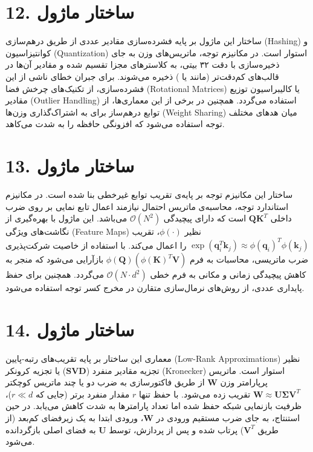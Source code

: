 \documentclass[12pt,a4paper]{report}
\begin{document}
\section*{12. ساختار ماژول }
ساختار این ماژول بر پایه فشرده‌سازی مقادیر عددی از طریق درهم‌سازی (Hashing) و کوانتیزاسیون (Quantization) استوار است. در مکانیزم توجه، ماتریس‌های وزن به جای ذخیره‌سازی با دقت ۳۲ بیتی، به کلاسترهای مجزا تقسیم شده و مقادیر آن‌ها در قالب‌های کم‌دقت‌تر (مانند  یا ) ذخیره می‌شوند. برای جبران خطای ناشی از این فشرده‌سازی، از تکنیک‌های چرخش فضا (Rotational Matrices) یا کالیبراسیون توزیع مقادیر (Outlier Handling) استفاده می‌گردد. همچنین در برخی از این معماری‌ها، از توابع درهم‌ساز برای به اشتراک‌گذاری وزن‌ها (Weight Sharing) میان هد‌های مختلف توجه استفاده می‌شود که افزونگی حافظه را به شدت می‌کاهد.

\section*{13. ساختار ماژول }
ساختار این مکانیزم توجه بر پایه‌ی تقریب توابع غیرخطی بنا شده است. در مکانیزم استاندارد توجه، محاسبه‌ی ماتریس احتمال نیازمند اعمال تابع نمایی بر روی ضرب داخلی $\mathbf{Q} \mathbf{K}^T$ است که دارای پیچیدگی $\mathcal{O}(N^2)$ می‌باشد. این ماژول با بهره‌گیری از نگاشت‌های ویژگی (Feature Maps) نظیر $\phi(\cdot)$، تقریب $\exp(\mathbf{q}_i^T \mathbf{k}_j) \approx \phi(\mathbf{q}_i)^T \phi(\mathbf{k}_j)$ را اعمال می‌کند. با استفاده از خاصیت شرکت‌پذیری ضرب ماتریسی، محاسبات به فرم $\phi(\mathbf{Q}) (\phi(\mathbf{K})^T \mathbf{V})$ بازآرایی می‌شود که منجر به کاهش پیچیدگی زمانی و مکانی به فرم خطی $\mathcal{O}(N \cdot d^2)$ می‌گردد. همچنین برای حفظ پایداری عددی، از روش‌های نرمال‌سازی متقارن در مخرج کسر توجه استفاده می‌شود.

\section*{14. ساختار ماژول }
معماری این ساختار بر پایه تقریب‌های رتبه-پایین (Low-Rank Approximations) نظیر تجزیه مقادیر منفرد ($\mathbf{SVD}$) یا تجزیه کرونکر (Kronecker) استوار است. ماتریس پرپارامتر وزن $\mathbf{W}$ از طریق فاکتورسازی به ضرب دو یا چند ماتریس کوچکتر $\mathbf{W} \approx \mathbf{U} \mathbf{\Sigma} \mathbf{V}^T$ تقریب زده می‌شود. با حفظ تنها $r$ مقدار منفرد برتر (جایی که $r \ll d$)، ظرفیت بازنمایی شبکه حفظ شده اما تعداد پارامترها به شدت کاهش می‌یابد. در حین استنتاج، به جای ضرب مستقیم ورودی در $\mathbf{W}$، ورودی ابتدا به یک زیرفضای کم‌بعد (از طریق $\mathbf{V}^T$) پرتاب شده و پس از پردازش، توسط $\mathbf{U}$ به فضای اصلی بازگردانده می‌شود.
\end{document}
